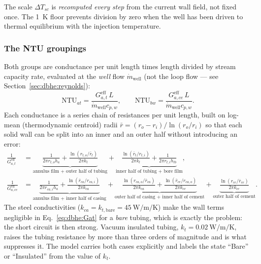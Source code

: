 \documentclass[11pt]{article}
\begin{document}
The scale $\Delta T_{sc}$ is \emph{recomputed every step} from the current wall
field, not fixed once. The \SI{1}{\kelvin} floor prevents division by zero when
the well has been driven to thermal equilibrium with the injection temperature.

\subsubsection{The NTU groupings}
Both groups are conductance per unit length times length divided by stream
capacity rate, evaluated at the \emph{well} flow $\dot m_{\mathrm{well}}$ (not
the loop flow --- see Section~\ref{sec:dbhe:reynolds}):
\begin{equation}
\mathrm{NTU}_{at}=\frac{G_{a,t}^{\mathrm{eff}}\,L}{\dot m_{\mathrm{well}}c_{p,w}}, \qquad
\mathrm{NTU}_{bw}=\frac{G_{a,ce}^{\mathrm{eff}}\,L}{\dot m_{\mathrm{well}}c_{p,w}} .
\label{eq:dbhe:NTUdef}
\end{equation}
Each conductance is a series chain of resistances per unit length, built on
log-mean (thermodynamic centroid) radii
$\bar r=(r_o-r_i)/\ln(r_o/r_i)$ so that each solid wall can be split into an
inner and an outer half without introducing an error:
\begin{align}
\frac{1}{G_{a,t}^{\mathrm{eff}}} &=\underbrace{\frac{1}{2\pi
r_{t,o}h_a}+\frac{\ln(r_{t,o}/\bar r_t)}{2\pi k_t}}_{\text{annulus film + outer half of
tubing}} +\underbrace{\frac{\ln(\bar r_t/r_{t,i})}{2\pi k_t}+\frac{1}{2\pi
r_{t,i}h_{tb}}}_{\text{inner half of tubing + bore film}},
\label{eq:dbhe:Gat}\\[4pt]
\frac{1}{G_{a,ce}^{\mathrm{eff}}} &=\underbrace{\frac{1}{2\pi r_{ca,i}h_a}+\frac{\ln(\bar
r_{ca}/r_{ca,i})}{2\pi k_{ca}}}_{\text{annulus film + inner half of casing}}
+\underbrace{\frac{\ln(r_{ca,o}/\bar r_{ca})}{2\pi k_{ca}}+\frac{\ln(\bar
r_{ce}/r_{ca,o})}{2\pi k_{ce}}}_{\text{outer half of casing + inner half of cement}}
+\underbrace{\frac{\ln(r_{ce}/\bar r_{ce})}{2\pi k_{ce}}}_{\text{outer half of cement}} .
\label{eq:dbhe:Gace}
\end{align}
The steel conductivities ($k_{ca}=k_{t,\mathrm{bare}}=\SI{45}{\watt\per\metre\per\kelvin}$)
make the wall terms negligible in Eq.~\eqref{eq:dbhe:Gat} for a \emph{bare}
tubing, which is exactly the problem: the short circuit is then strong. Vacuum
insulated tubing, $k_t=\SI{0.02}{\watt\per\metre\per\kelvin}$, raises the tubing
resistance by more than three orders of magnitude and is what suppresses it. The
model carries both cases explicitly and labels the state ``Bare'' or
``Insulated'' from the value of $k_t$.
\end{document}
